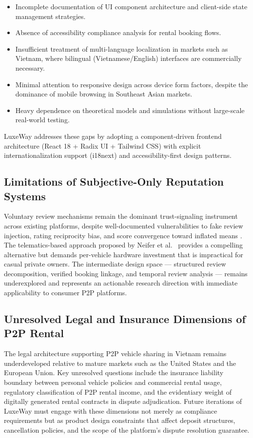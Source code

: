 \begin{itemize}
    \item Incomplete documentation of UI component architecture and client-side state management strategies.
    \item Absence of accessibility compliance analysis for rental booking flows.
    \item Insufficient treatment of multi-language localization in markets such as Vietnam, where bilingual (Vietnamese/English) interfaces are commercially necessary.
    \item Minimal attention to responsive design across device form factors, despite the dominance of mobile browsing in Southeast Asian markets.
    \item Heavy dependence on theoretical models and simulations without large-scale real-world testing.
\end{itemize}

LuxeWay addresses these gaps by adopting a component-driven frontend architecture (React 18 + Radix UI + Tailwind CSS) with explicit internationalization support (i18next) and accessibility-first design patterns.

\subsection{Limitations of Subjective-Only Reputation Systems}

Voluntary review mechanisms remain the dominant trust-signaling instrument across existing platforms, despite well-documented vulnerabilities to fake review injection, rating reciprocity bias, and score convergence toward inflated means \cite{hu2019sharing}. The telematics-based approach proposed by Neifer et al.\ \cite{neifer2024trust} provides a compelling alternative but demands per-vehicle hardware investment that is impractical for casual private owners. The intermediate design space --- structured review decomposition, verified booking linkage, and temporal review analysis --- remains underexplored and represents an actionable research direction with immediate applicability to consumer P2P platforms.

\subsection{Unresolved Legal and Insurance Dimensions of P2P Rental}

The legal architecture supporting P2P vehicle sharing in Vietnam remains underdeveloped relative to mature markets such as the United States and the European Union. Key unresolved questions include the insurance liability boundary between personal vehicle policies and commercial rental usage, regulatory classification of P2P rental income, and the evidentiary weight of digitally generated rental contracts in dispute adjudication. Future iterations of LuxeWay must engage with these dimensions not merely as compliance requirements but as product design constraints that affect deposit structures, cancellation policies, and the scope of the platform's dispute resolution guarantee.
